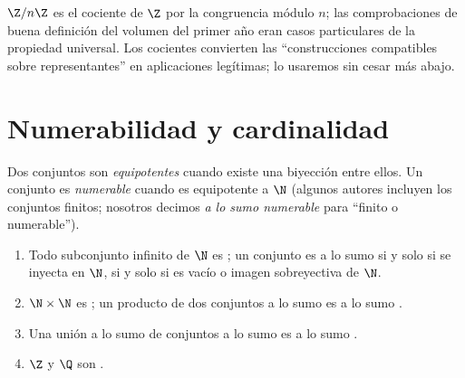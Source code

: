 \begin{example}
$\Z/n\Z$ es el cociente de $\Z$ por la congruencia módulo $n$; las
comprobaciones de buena definición del volumen del primer año eran
casos particulares de la propiedad universal. Los cocientes
convierten las ``construcciones compatibles sobre representantes''
en aplicaciones legítimas; lo usaremos sin cesar más abajo.
\end{example}

\section{Numerabilidad y cardinalidad}

\begin{definition}\label{def:b2:structures:countable}
Dos conjuntos son \emph{equipotentes} cuando
existe una biyección entre ellos. Un conjunto es
\emph{numerable} cuando es equipotente a
$\N$ (algunos autores incluyen los conjuntos finitos; nosotros
decimos \emph{a lo sumo numerable} para ``finito o numerable'').
\end{definition}

\begin{proposition}\label{prop:b2:structures:countablestable}
\begin{enumerate}
  \item Todo subconjunto infinito de $\N$ es ; un conjunto es a lo
        sumo  si y solo si se inyecta en $\N$, si y solo si es
        vacío o imagen sobreyectiva de $\N$.
  \item $\N \times \N$ es ; un producto de dos conjuntos a lo
        sumo  es a lo sumo .
  \item Una unión a lo sumo  de conjuntos a lo sumo
         es a lo sumo .
  \item $\Z$ y $\Q$ son .
\end{enumerate}
\end{proposition}

